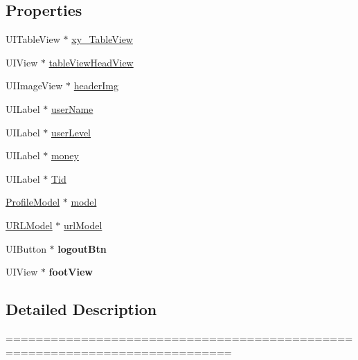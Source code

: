 \subsection*{Properties}
\begin{DoxyCompactItemize}
\item 
U\+I\+Table\+View $\ast$ \mbox{\hyperlink{category_top_mine_view_controller_07_08_a98486da78cf3bc78a06f29c0ac953735}{xy\+\_\+\+Table\+View}}
\item 
U\+I\+View $\ast$ \mbox{\hyperlink{category_top_mine_view_controller_07_08_aa97ff9da1f3045b226d450d478962522}{table\+View\+Head\+View}}
\item 
U\+I\+Image\+View $\ast$ \mbox{\hyperlink{category_top_mine_view_controller_07_08_a6b52281560e4046b53f3d37bf38f147f}{header\+Img}}
\item 
U\+I\+Label $\ast$ \mbox{\hyperlink{category_top_mine_view_controller_07_08_a538fda9fcd5ad654c4417204f69ce32c}{user\+Name}}
\item 
U\+I\+Label $\ast$ \mbox{\hyperlink{category_top_mine_view_controller_07_08_ac006d7859a88094a29d0a6d54b93c9ec}{user\+Level}}
\item 
U\+I\+Label $\ast$ \mbox{\hyperlink{category_top_mine_view_controller_07_08_ae36550f6d08ffbb0c3e8e8c2829ebf03}{money}}
\item 
U\+I\+Label $\ast$ \mbox{\hyperlink{category_top_mine_view_controller_07_08_ac2393600466c8a9d76cc26be3541eb2b}{Tid}}
\item 
\mbox{\hyperlink{interface_profile_model}{Profile\+Model}} $\ast$ \mbox{\hyperlink{category_top_mine_view_controller_07_08_a6f645336ac088e8adcd7490ba65f7a4a}{model}}
\item 
\mbox{\hyperlink{interface_u_r_l_model}{U\+R\+L\+Model}} $\ast$ \mbox{\hyperlink{category_top_mine_view_controller_07_08_a044bd08ca6680ca4a0b8fc3697d18dba}{url\+Model}}
\item 
\mbox{\label{category_top_mine_view_controller_07_08_aca1a2cdfd424ef3426c173f688c6c39b}} 
U\+I\+Button $\ast$ {\bfseries logout\+Btn}
\item 
\mbox{\label{category_top_mine_view_controller_07_08_acd2070d45d924486a8267ecb11b2bb11}} 
U\+I\+View $\ast$ {\bfseries foot\+View}
\end{DoxyCompactItemize}


\subsection{Detailed Description}
============================================================================

